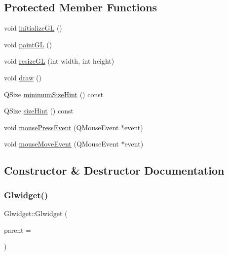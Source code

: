 \subsection*{Protected Member Functions}
\begin{DoxyCompactItemize}
\item 
void \mbox{\hyperlink{class_glwidget_a5f266609dcd89e1291539a498ce42cbb}{initialize\+GL}} ()
\item 
void \mbox{\hyperlink{class_glwidget_a440fe507a9bd647c1a961cf72305da31}{paint\+GL}} ()
\item 
void \mbox{\hyperlink{class_glwidget_a36bd98ea1696cf1a7f5830fde3a16a72}{resize\+GL}} (int width, int height)
\item 
void \mbox{\hyperlink{class_glwidget_ac54d1b859e11037f3e86f3193e84970b}{draw}} ()
\item 
Q\+Size \mbox{\hyperlink{class_glwidget_a9768cbeb06b6ccfaff47ff443dda1c98}{minimum\+Size\+Hint}} () const
\item 
Q\+Size \mbox{\hyperlink{class_glwidget_a0dfc5b597184e106d7bcf921ba24b09a}{size\+Hint}} () const
\item 
void \mbox{\hyperlink{class_glwidget_a0e3f033e0fa941505114a32d35823c70}{mouse\+Press\+Event}} (Q\+Mouse\+Event $\ast$event)
\item 
void \mbox{\hyperlink{class_glwidget_afc8a6da76c5ead92b1c1a4ba8f931310}{mouse\+Move\+Event}} (Q\+Mouse\+Event $\ast$event)
\end{DoxyCompactItemize}


\subsection{Constructor \& Destructor Documentation}
\mbox{\label{class_glwidget_a498977aa216afadd4adba780063356ac}} 
\subsubsection{\texorpdfstring{Glwidget()}{Glwidget()}}
{\footnotesize\ttfamily Glwidget\+::\+Glwidget (\begin{DoxyParamCaption}\item[{Q\+Widget $\ast$}]{parent = {} }\end{DoxyParamCaption})\hspace{0.3cm}{\ttfamily [explicit]}}


